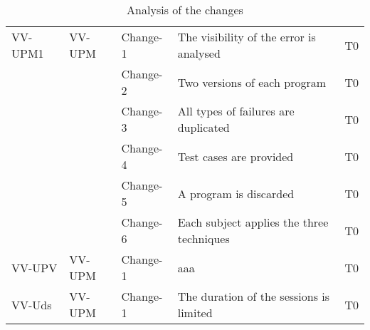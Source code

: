 \begin{table}
\begin{minipage}{6cm}
\begin{tabular}{| l | l | l |p{6.5cm} |  l |}
VV-UPM1 & VV-UPM & Change-1 & The visibility of the error is analysed  & T0 \\
~ & ~ & Change-2 &  Two versions of each program  & T0 \\
~ & ~ & Change-3 &  All types of failures are duplicated  & T0 \\
~ & ~ & Change-4 &  Test cases are provided & T0 \\
~ & ~ & Change-5 &  A program is discarded & T0 \\
~ & ~ & Change-6 &  Each subject applies the three techniques & T0 \\ \hline
VV-UPV & VV-UPM & Change-1 & aaa & T0 \\
VV-Uds & VV-UPM & Change-1 & The duration of the sessions is limited & T0 \\





\hline

\end{tabular}
\end{minipage}

\caption{Analysis of the changes}
\label{tab:changes}
\end{table}



